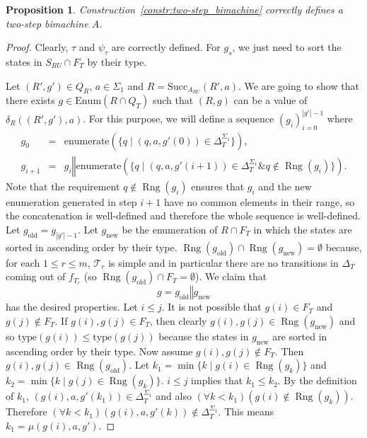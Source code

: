 \documentclass{article}
\newtheorem{proposition}[definition]{Proposition}
\newcommand{\len}[1]{\ensuremath{\left| #1 \right|}}
\DeclareMathOperator{\Rng}{Rng}
\begin{document}
	\begin{proposition} \label{prop:construction_two-step_bimachine_correctness}
		Construction~\ref{constr:two-step_bimachine} correctly defines a two-step bimachine $A$.
	\end{proposition}
	\begin{proof}
		Clearly, $\tau$ and $\psi_\tau$ are correctly defined.
		For $g_s$, we just need to sort the states in $S_{RU}\cap F_T$ by their type.
		
		Let $(R', g')\in Q_R$, $a\in \Sigma_1$ and $R = \mathrm{Succ}_{A_{RU}}(R', a)$.
		We are going to show that there exists $g\in \mathrm{Enum}(R \cap Q_T)$ such that $(R, g)$ can be a value of $\delta_R((R', g'), a)$. For this purpose, we will define a sequence $(g_i)_{i=0}^{\len{g'}-1}$ where
		\begin{eqnarray*}
			g_0 & = & \mathrm{enumerate}(\{ q\mid (q, a, g'(0))\in\Delta_T^{\Sigma_1} \}), \\
			g_{i+1} & = & g_i\mathbin\Vert\mathrm{enumerate}(\{ q\mid (q, a, g'(i+1))\in\Delta_T^{\Sigma_1} \mathbin\& q\notin \Rng(g_i) \}).
		\end{eqnarray*}
		Note that the requirement $q\notin \Rng(g_i)$ ensures that $g_i$ and the new enumeration generated in step $i+1$ have no common elements in their range, so the concatenation is well-defined and therefore the whole sequence is well-defined. Let $g_\mathrm{old} = g_{\len{g'}-1}$.
		Let $g_\mathrm{new}$ be the enumeration of $R\cap F_T$ in which the states are sorted in ascending order by their type.
		$\Rng(g_\mathrm{old})\cap \Rng(g_\mathrm{new}) = \emptyset$ because, for each $1\le r\le m$, $\mathcal{T}_r$ is simple and in particular there are no transitions in $\Delta_T$ coming out of $f_{T_r}$ (so $\Rng(g_\mathrm{old})\cap F_T = \emptyset$). We claim that \[ g = g_\mathrm{old} \mathbin\Vert g_\mathrm{new} \] has the desired properties. Let $i\le j$.
		It is not possible that $g(i)\in F_T$ and $g(j)\notin F_T$.
		If $g(i), g(j)\in F_T$, then clearly $g(i), g(j)\in \Rng(g_\mathrm{new})$ and so $\mathrm{type}(g(i))\le \mathrm{type}(g(j))$ because the states in $g_\mathrm{new}$ are sorted in ascending order by their type.
		Now assume $g(i), g(j)\notin F_T$. Then $g(i), g(j)\in \Rng(g_\mathrm{old})$.
		Let $k_1 = \min\{k\mid g(i)\in \Rng(g_k)\}$ and $k_2 = \min\{k\mid g(j)\in \Rng(g_k)\}$. $i\le j$ implies that $k_1\le k_2$.
		By the definition of $k_1$, $(g(i), a, g'(k_1))\in \Delta_T^{\Sigma_1}$ and also $(\forall k<k_1)(g(i)\notin \Rng(g_k))$.
		Therefore $(\forall k<k_1)(g(i), a, g'(k))\notin \Delta_T^{\Sigma_1}$. This means $k_1 = \mu(g(i), a, g')$.

\end{proof}
\end{document}
